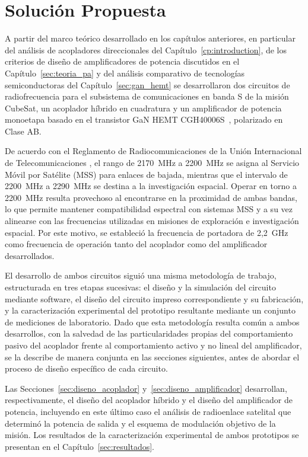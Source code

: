 \chapter[Solución propuesta]{Solución Propuesta} \label{sec:solucion_propuesta}
A partir del marco teórico desarrollado en los capítulos anteriores, en particular del análisis de acopladores direccionales del Capítulo~\ref{cp:introduction}, de los criterios de diseño de amplificadores de potencia discutidos en el Capítulo~\ref{sec:teoria_pa} y del análisis comparativo de tecnologías semiconductoras del Capítulo~\ref{sec:gan_hemt} se desarrollaron dos circuitos de radiofrecuencia para el subsistema de comunicaciones en banda S de la misión CubeSat, un acoplador híbrido en cuadratura y un amplificador de potencia monoetapa basado en el transistor GaN HEMT CGH40006S~\cite{macom}, polarizado en Clase AB.

De acuerdo con el Reglamento de Radiocomunicaciones de la Unión Internacional de Telecomunicaciones \cite{itu2024}, el rango de 2170~MHz a 2200~MHz se asigna al Servicio Móvil por Satélite (MSS) para enlaces de bajada, mientras que el intervalo de 2200~MHz a 2290~MHz se destina a la investigación espacial. Operar en torno a 2200~MHz resulta provechoso al encontrarse en la proximidad de ambas bandas, lo que permite mantener compatibilidad espectral con sistemas MSS y a su vez alinearse con las frecuencias utilizadas en misiones de exploración e investigación espacial. Por este motivo, se estableció la frecuencia de portadora de 2,2~GHz como frecuencia de operación tanto del acoplador como del amplificador desarrollados.

El desarrollo de ambos circuitos siguió una misma metodología de trabajo, estructurada en tres etapas sucesivas: el diseño y la simulación del circuito mediante software, el diseño del circuito impreso correspondiente y su fabricación, y la caracterización experimental del prototipo resultante mediante un conjunto de mediciones de laboratorio. Dado que esta metodología resulta común a ambos desarrollos, con la salvedad de las particularidades propias del comportamiento pasivo del acoplador frente al comportamiento activo y no lineal del amplificador, se la describe de manera conjunta en las secciones siguientes, antes de abordar el proceso de diseño específico de cada circuito.

Las Secciones~\ref{sec:diseno_acoplador} y~\ref{sec:diseno_amplificador} desarrollan, respectivamente, el diseño del acoplador híbrido y el diseño del amplificador de potencia, incluyendo en este último caso el análisis de radioenlace satelital que determinó la potencia de salida y el esquema de modulación objetivo de la misión. Los resultados de la caracterización experimental de ambos prototipos se presentan en el Capítulo~\ref{sec:resultados}.

